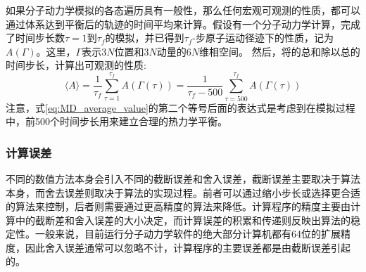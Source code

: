 如果分子动力学模拟的各态遍历具有一般性，那么任何宏观可观测的性质，都可以通过体系达到平衡后的轨迹的时间平均来计算。假设有一个分子动力学计算，完成了时间步长数$\tau=1$到$\tau_f$的模拟，并已得到$\tau_f$-步原子运动径迹下的性质，记为$A(\Gamma)$。这里，$\Gamma$表示3$N$位置和3$N$动量的6$N$维相空间。
然后，将的总和除以总的时间步长，计算出可观测的性质:
\begin{equation}
	\langle A\rangle=\dfrac1{\tau_f}\sum_{\tau=1}^{\tau_f}A(\Gamma(\tau))=\dfrac1{\tau_f-500}\sum_{\tau=500}^{\tau_f}A(\Gamma(\tau))
	\label{eq:MD_average_value}
\end{equation}
注意，式\eqref{eq:MD_average_value}的第二个等号后面的表达式是考虑到在模拟过程中，前500个时间步长用来建立合理的热力学平衡。%
\subsubsection{计算误差}
不同的数值方法本身会引入不同的截断误差和舍入误差，截断误差主要取决于算法本身，而舍去误差则取决于算法的实现过程。前者可以通过缩小步长或选择更合适的算法来控制，后者则需要通过更高精度的算法来降低。计算程序的精度主要由计算中的截断差和舍入误差的大小决定，而计算误差的积累和传递则反映出算法的稳定性。一般来说，目前运行分子动力学软件的绝大部分计算机都有64位的扩展精度，因此舍入误差通常可以忽略不计，计算程序的主要误差都是由截断误差引起的。
